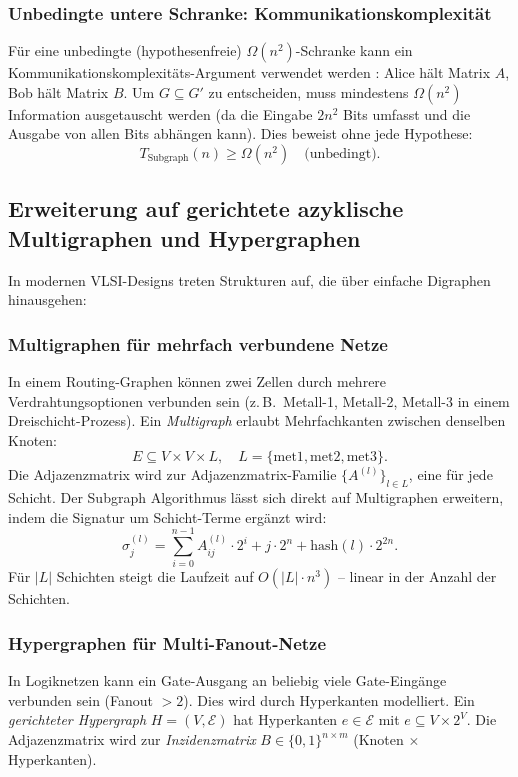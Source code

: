 ﻿\documentclass[a4paper,12pt]{article}
\theoremstyle{definition}
\begin{document}
\subsubsection{Unbedingte untere Schranke: Kommunikationskomplexität}

Für eine unbedingte (hypothesenfreie) $\Omega(n^2)$-Schranke kann ein
Kommunikationskomplexitäts-Argument verwendet werden \cite{kushilevitz1997communication}:
Alice hält Matrix $A$, Bob hält Matrix $B$. Um $G \subseteq G'$ zu entscheiden, muss
mindestens $\Omega(n^2)$ Information ausgetauscht werden (da die Eingabe $2n^2$ Bits
umfasst und die Ausgabe von allen Bits abhängen kann). Dies beweist ohne jede Hypothese:
\[
  T_{\text{Subgraph}}(n) \geq \Omega(n^2) \quad \text{(unbedingt)}.
\]

\subsection{Erweiterung auf gerichtete azyklische Multigraphen und Hypergraphen}

In modernen VLSI-Designs treten Strukturen auf, die über einfache Digraphen
hinausgehen:

\subsubsection{Multigraphen für mehrfach verbundene Netze}

In einem Routing-Graphen können zwei Zellen durch mehrere Verdrahtungsoptionen
verbunden sein (z.\,B.\ Metall-1, Metall-2, Metall-3 in einem Dreischicht-Prozess).
Ein \emph{Multigraph} erlaubt Mehrfachkanten zwischen denselben Knoten:
\[
  E \subseteq V \times V \times L, \quad L = \{\text{met1}, \text{met2}, \text{met3}\}.
\]
Die Adjazenzmatrix wird zur Adjazenzmatrix-Familie $\{A^{(l)}\}_{l \in L}$, eine für
jede Schicht. Der Subgraph Algorithmus lässt sich direkt auf Multigraphen erweitern,
indem die Signatur um Schicht-Terme ergänzt wird:
\[
  \sigma_j^{(l)} = \sum_{i=0}^{n-1} A_{ij}^{(l)} \cdot 2^i + j \cdot 2^n + \text{hash}(l) \cdot 2^{2n}.
\]
Für $|L|$ Schichten steigt die Laufzeit auf $O(|L| \cdot n^3)$ -- linear in der Anzahl
der Schichten.

\subsubsection{Hypergraphen für Multi-Fanout-Netze}

In Logiknetzen kann ein Gate-Ausgang an beliebig viele Gate-Eingänge verbunden sein
(Fanout $> 2$). Dies wird durch Hyperkanten modelliert. Ein
\emph{gerichteter Hypergraph} $H = (V, \mathcal{E})$ hat Hyperkanten
$e \in \mathcal{E}$ mit $e \subseteq V \times 2^V$. Die Adjazenzmatrix wird zur
\emph{Inzidenzmatrix} $B \in \{0,1\}^{n \times m}$ (Knoten $\times$ Hyperkanten).
\end{document}
